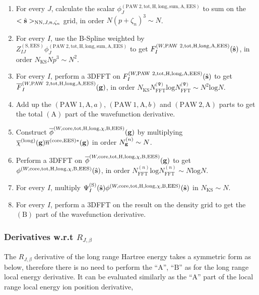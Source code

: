 \documentclass[paper=a4, fontsize=11pt]{article} %
\numberwithin{equation}{section} %
\numberwithin{figure}{section} %
\numberwithin{table}{section} %
\newcommand{\ol}{\overline}
\newcommand{\bg}{{\bf{g}}}
\newcommand{\hs}{{\hat{\bf{s}}}}
\newcommand{\rS}{{\mathrm{S}}}
\newcommand{\rEES}{{\mathrm{EES}}}
\newcommand{\rcore}{{\mathrm{core}}}
\newcommand{\rNN}{{\mathrm{NN}}}
\newcommand{\rlong}{{\mathrm{long}}}
\newcommand{\rP}{{\mathrm{PAW}}}
\newcommand{\rH}{{\mathrm{H}}}
\newcommand{\rA}{{\mathrm{A}}}
\newcommand{\rB}{{\mathrm{B}}}
\newcommand{\rsum}{{\mathrm{sum}}}
\newcommand{\rl}{{\mathrm{log}}}
\newcommand{\rtot}{{\mathrm{tot}}}
\newcommand{\RJb}{{R_{J,\beta}}}
\newcommand{\NKS}{{N_{\mathrm{KS}}}}
\newcommand{\NFFTn}{{N^{(n)}_{\mathrm{FFT}}}}
\newcommand{\NFFTp}{{N^{\mathrm{(\Psi})}_{\mathrm{FFT}}}}
\newcommand{\Ngn}{{N^{(n)}_\bg}}
\newcommand{\pzn}{{(p+\zeta_n)^3}}
\newcommand{\hsJn}{{<\hs>_{\rNN,J,n,\zeta_n}}}
\begin{document}
\begin{enumerate}
\item For every $J$, calculate the scalar $\phi_J^{(\rP\ 2,\rtot,\rH,\rlong,\rsum,\rA,\rEES)}$ to sum on the $\hsJn$ grid, in order $N \pzn \sim N$.
\item For every $I$, use the B-Spline weighted by $Z_{IJ}^{(\rS,\rEES)}\phi_J^{(\rP\ 2,\rtot,\rH,\rlong,\rsum,\rA,\rEES)}$ to get $F_I^{(W,\rP\ 2,\rtot,\rH,\rlong,\rA,\rEES)}(\hs)$, in order $\NKS N p^3 \sim N^2$.
\item For every $I$, perform a 3DFFT on $F_I^{(W,\rP\ 2,\rtot,\rH,\rlong,\rA,\rEES)}(\hs)$ to get $\ol F_I^{(W,\rP\ 2,\rtot,\rH,\rlong,\rA,\rEES)}(\bg)$, in order $\NKS \NFFTp \rl \NFFTp \sim N^2 \rl N$.
\item Add up the $(\rP\ 1,\rA,a)$, $(\rP\ 1,\rA,b)$ and $(\rP\ 2,\rA)$ parts to get the total $(\rA)$ part of the wavefunction derivative.
\item Construct $\ol \phi^{(W,\rcore,\rtot,\rH,\rlong,\chi,\rB,\rEES)}(\bg)$ by multiplying $\ol \chi^{(\rlong)} (\bg) \ol{n}^{(\rcore,\rEES)*}(\bg)$ in order $\Ngn \sim N$.
\item Perform a 3DFFT on $\ol \phi^{(W,\rcore,\rtot,\rH,\rlong,\chi,\rB,\rEES)}(\bg)$ to get $\phi^{(W,\rcore,\rtot,\rH,\rlong,\chi,\rB,\rEES)}(\hs)$, in order $\NFFTn \rl \NFFTn \sim N \rl N$.
\item For every $I$, multiply $\Psi_I^{(\rS)}(\hs)\phi^{(W,\rcore,\rtot,\rH,\rlong,\chi,\rB,\rEES)}(\hs)$ in $\NKS \sim N$.
\item For every $I$, perform a 3DFFT on the result on the density grid to get the $(\rB)$ part of the wavefunction derivative.
\end{enumerate}

\newpage
\subsubsection{Derivatives w.r.t $\RJb$}
The $\RJb$ derivative of the long range Hartree energy takes a symmetric form as below, therefore there is no need to perform the ``$\rA$'', ``$\rB$'' as for the long range local energy derivative. It can be evaluated similarly as the ``$\rA$'' part of the local range local energy ion position derivative,
\end{document}
